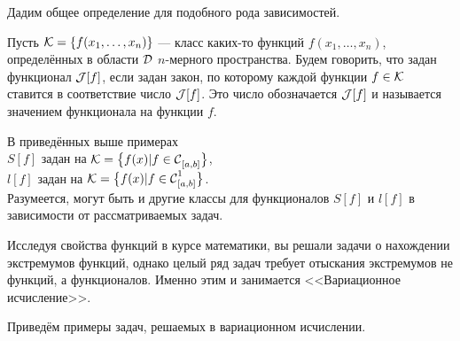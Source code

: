 \noindent Дадим общее определение для подобного рода зависимостей.
\begin{_def}
	Пусть $\mc{K}=\{f(x_1,\ldots,x_n)\}$ --- класс каких-то функций $f(x_1,\ldots,x_n)$, определённых в области $\mc{D}$ $n$-мерного пространства. Будем говорить, что задан функционал $\J[f]$, если задан закон, по которому каждой функции $f\in\mc{K}$ ставится в соответствие число $\J[f]$. Это число обозначается $\J[f]$ и называется значением функционала на функции $f$.
\end{_def}

\noindent В приведённых выше примерах \\
\indent$S[f]$ задан на $\mc{K}=\big\{f(x)|f\in \Cfn[{[a,b]}]{}\big\}$,\\
\indent $l[f]$ задан на $\mc{K}=\big\{f(x)|f\in \Cfn[{[a,b]}]{1}\big\}$.\\
Разумеется, могут быть и другие классы для функционалов $S[f]$ и $l[f]$ в зависимости от рассматриваемых задач.

Исследуя свойства функций в курсе математики, вы решали задачи о нахождении экстремумов функций, однако целый ряд задач требует отыскания экстремумов не функций, а функционалов. Именно этим и занимается <<Вариационное исчисление>>.
\vspace{0.25cm}

Приведём примеры задач, решаемых в вариационном исчислении.

